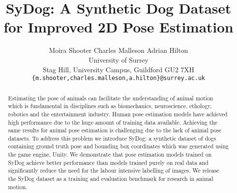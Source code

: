 \documentclass[final]{cvpr}
\begin{document}
\title{SyDog: A Synthetic Dog Dataset for Improved 2D Pose Estimation}

\author{Moira Shooter \qquad Charles Malleson \qquad Adrian Hilton \\
University of Surrey\\
Stag Hill, University Campus, Guildford GU2 7XH\\
{\tt\small \{m.shooter,charles.malleson,a.hilton\}@surrey.ac.uk}
}


\maketitle


\begin{abstract}
Estimating the pose of animals can facilitate the understanding of animal motion which is fundamental in disciplines such as biomechanics, neuroscience, ethology, robotics and the entertainment industry. Human pose estimation models have achieved high performance due to the huge amount of training data available. Achieving the same results for animal pose estimation is challenging due to the lack of animal pose datasets. To address this problem we introduce SyDog: a synthetic dataset of dogs containing ground truth pose and bounding box coordinates which was generated using the game engine, Unity.
We demonstrate that pose estimation models trained on SyDog achieve better performance than models trained purely on real data and significantly reduce the need for the labour intensive labelling of images. We release the SyDog dataset as a training and evaluation benchmark for research in animal motion. 
\end{abstract}
\end{document}
